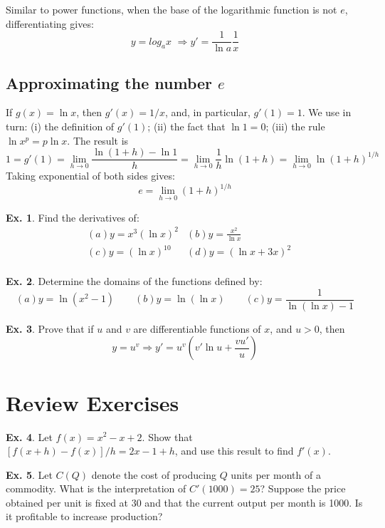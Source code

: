 \documentclass[10pt,a4paper]{book}
\theoremstyle{definition}\newtheorem{definition}{Definition}
\theoremstyle{definition}\newtheorem{fact}{Fact}
\theoremstyle{definition}\newtheorem{ex}{Ex.}
\theoremstyle{definition}\newtheorem{project}{Project}
\theoremstyle{definition}\newtheorem{problem}{Problem}
\theoremstyle{definition}\newtheorem{example}{Example}
\numberwithin{theorem}{chapter}
\numberwithin{corollary}{chapter}
\numberwithin{assumption}{chapter}
\numberwithin{definition}{chapter}
\numberwithin{prop}{chapter}
\numberwithin{notation}{chapter}
\numberwithin{problem}{chapter}
\numberwithin{example}{chapter}
\numberwithin{fact}{chapter}
\numberwithin{ex}{chapter}
\begin{document}
	Similar to power functions, when the base of the logarithmic function is not $e$, differentiating gives:
	$$y=log_a x \,\, \Rightarrow y'=\frac{1}{\ln a}\frac{1}{x}$$
	
	\subsection{Approximating the number $e$}
	
	If $g(x) = \ln x$, then $g'(x) = 1/x$, and, in particular, $g'(1) = 1$. We use in turn: (i) the definition of $g'(1)$; (ii) the fact that $\ln1 = 0$; (iii) the rule $\ln x^p = p\ln x$. The result is
	$$1=g'(1)=\lim_{h\rightarrow0}\frac{\ln(1+h)-\ln1}{h}=\lim_{h\rightarrow0}\frac{1}{h}\ln(1+h)=\lim_{h\rightarrow0}\ln(1+h)^{1/h}$$
	Taking exponential of both sides gives:
	$$e=\lim_{h\rightarrow0}(1+h)^{1/h}$$
	
	\begin{ex}
		Find the derivatives of:
		\begin{align*}
			& (a) y=x^3(\ln x)^2      
			& (b) y=\frac{x^2}{\ln x} \\
			& (c) y=(\ln x)^{10}      
			& (d) y=(\ln x+3x)^2      \\
		\end{align*}
	\end{ex}
	
	\begin{ex}
		Determine the domains of the functions defined by:
		\begin{equation*}
			(a) y=\ln(x^2-1) \qquad
			(b) y=\ln(\ln x) \qquad
			(c) y=\frac{1}{\ln(\ln x)-1}
		\end{equation*}
	\end{ex}
	
	\begin{ex}
		Prove that if $u$ and $v$ are differentiable functions of $x$, and $u > 0$, then
		$$y=u^v \Rightarrow y'=u^v \left(v'\ln u+\frac{vu'}{u} \right)$$
	\end{ex}
	
	\section{Review Exercises}
	
	\begin{ex}
		Let $f(x)=x^2-x+2$. Show that $[f(x+h)-f(x)]/h=2x-1+h$, and use this result to find $f'(x)$.
	\end{ex}
	
	\begin{ex}
		Let $C(Q)$ denote the cost of producing $Q$ units per month of a commodity. What is the interpretation of $C'(1000) = 25$? Suppose the price obtained per unit is fixed at 30 and that the current output per month is 1000. Is it profitable to increase production?
	\end{ex}
	
\end{document}

